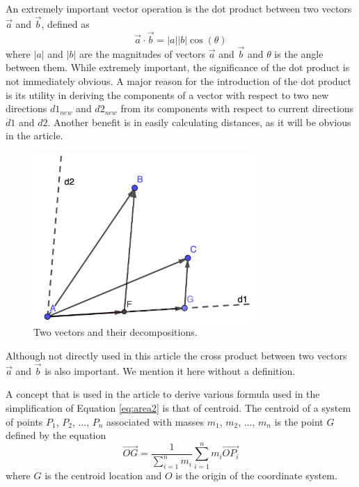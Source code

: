 \documentclass[12pt]{article}
\begin{document}
An extremely important vector operation is the dot product between two vectors $\vec{a}$ and $\vec{b}$, defined as 
\begin{equation}
\vec{a}\cdot\vec{b}=|a||b|\cos(\theta)
\label{eq:dotProduct}
\end{equation}
where $|a|$ and $|b|$ are the magnitudes of vectors $\vec{a}$ and $\vec{b}$ and $\theta$ is the angle between them.  While extremely important, the significance of the dot product is not immediately obvious. A major reason for the introduction of the dot product is its utility in deriving the components of a vector with respect to two new directions $d1_{new}$ and $d2_{new}$ from its components with respect to current directions $d1$ and $d2$.  Another benefit is in easily calculating distances, as it will be obvious in the article.

\begin{figure}[h]
    \centering
    \includegraphics[width=0.75\textwidth]{Vectors.png}
    \caption{Two vectors and their decompositions.}
    \label{fig:vectors}
    \end{figure}

Although not directly used in this article the cross product between two vectors $\vec{a}$ and $\vec{b}$ is also important. We mention it here without a definition.

A concept that is used in the article to derive various formula used in the simplification of Equation \ref{eq:area2} is that of centroid. The centroid of a system of points $P_1$, $P_2$, ..., $P_n$ associated with masses $m_1$, $m_2$, ..., $m_n$ is the point $G$ defined by the equation
\begin{equation}
\vec{OG}=\frac{1}{\sum_{i=1}^n m_i}\sum_{i=1}^{n}m_i\vec{OP_i}
\label{eq:centroid}
\end{equation}
where $G$ is the centroid location and $O$ is the origin of the coordinate system.
\end{document}
